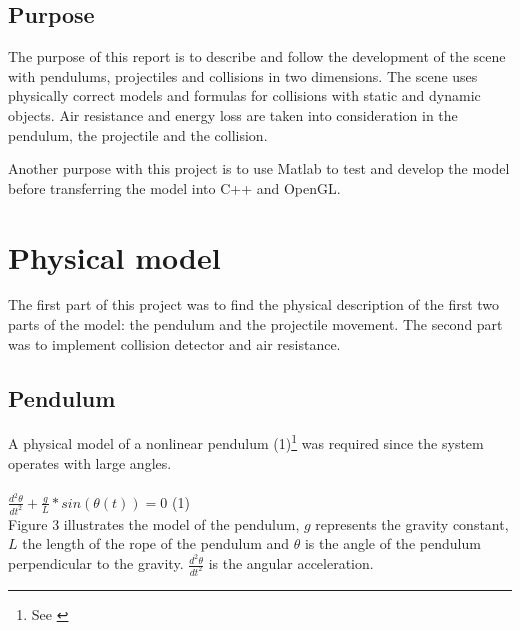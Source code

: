 \documentclass[a4paper,12pt,twoside,english]{article}
\begin{document}
\subsection{Purpose}
The purpose of this report is to describe and follow the development of the scene with pendulums, projectiles and collisions in two dimensions. The scene uses physically correct models and formulas for collisions with static and dynamic objects. Air resistance and energy loss are taken into consideration in the pendulum, the projectile and the collision.

Another purpose with this project is to use Matlab to test and develop the model before transferring the model into C++ and OpenGL. 

\section{Physical model}
The first part of this project was to find the physical description of the first two parts of the model: the pendulum and the projectile movement. The second part was to implement collision detector and air resistance. 
\subsection{Pendulum}
A physical model of a nonlinear pendulum (1)\footnote{See \cite[p.~64]{Hal:10}} was required since the system operates with large angles. \cite{Nor:06} \\ \\
$\frac{d^2\theta}{dt^2} + \frac{g}{L}*sin(\theta(t)) = 0$ \hfill (1) \\  

Figure 3 illustrates the model of the pendulum, $g$ represents the gravity constant, $L$ the length of the rope of the pendulum and $\theta$ is the angle of the pendulum perpendicular to the gravity.  $\frac{d^2\theta}{dt^2}$ is the angular acceleration.
\end{document}
